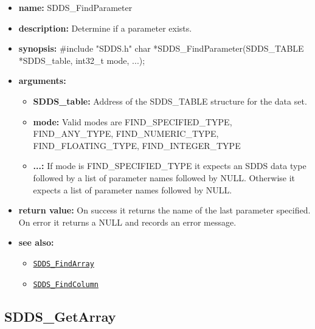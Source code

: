 \documentclass[11pt]{article}
\newcommand{\progref}[1]{\hyperref[SDDS_#1]{\tt SDDS\_#1}}
\begin{document}
\begin{itemize}
\item {\bf name:}\newline
SDDS\_FindParameter
\item {\bf description:}\newline
Determine if a parameter exists.
\item {\bf synopsis:} \#include "SDDS.h"\newline
char *SDDS\_FindParameter(SDDS\_TABLE *SDDS\_table, int32\_t mode, ...);
\item {\bf arguments:}
\begin{itemize}
\item {\bf SDDS\_table:} Address of the SDDS\_TABLE structure for the data set.
\item {\bf mode:} Valid modes are FIND\_SPECIFIED\_TYPE, FIND\_ANY\_TYPE, FIND\_NUMERIC\_TYPE, FIND\_FLOATING\_TYPE, FIND\_INTEGER\_TYPE
\item {\bf ...:} If mode is FIND\_SPECIFIED\_TYPE it expects an SDDS data type followed by a list of parameter names followed by NULL. Otherwise it expects a list of parameter names followed by NULL.
\end{itemize}
\item {\bf return value:}\newline
On success it returns the name of the last parameter specified. On error it returns a NULL and records an error message.
\item {\bf see also:}
\begin{itemize}
\item \progref{FindArray}
\item \progref{FindColumn}
\end{itemize}
\end{itemize}

\subsection{SDDS\_GetArray}
\label{SDDS_GetArray}
\end{document}
